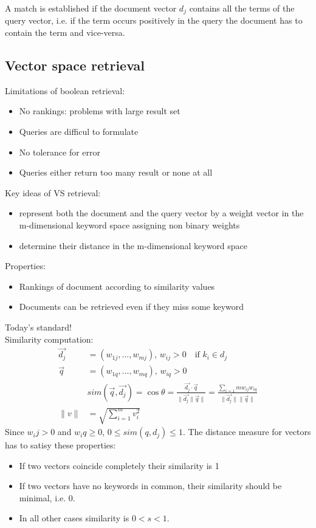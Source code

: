 A match is established if the document vector $ d_j $ contains
all the terms of the query vector, i.e. if the term occurs positively in
the query the document has to contain the term and vice-versa.

\subsection{Vector space retrieval}
Limitations of boolean retrieval:
\begin{itemize}
\item No rankings: problems with large result set
\item Queries are difficul to formulate
\item No tolerance for error
\item Queries either return too many result or none at all
\end{itemize}

Key ideas of VS retrieval:
\begin{itemize}
\item represent both the document and the query vector by a weight
  vector in the m-dimensional keyword space assigning non binary weights
\item determine their distance in the m-dimensional keyword space
\end{itemize}

Properties:
\begin{itemize}
\item Rankings of document according to similarity values
\item Documents can be retrieved even if they miss some keyword
\end{itemize}
Today's standard!
\\ Similarity computation:
\begin{align*}
  \vec{d_j} &= (w_{1j}, \ldots, w_{mj}), \, w_{ij} > 0 \quad \text{if } k_i \in d_j \\
  \vec{q} & = (w_{1q}, \ldots, w_{mq}), \, w_{iq} > 0 \\
            & sim(\vec{q}, \vec{d_j}) = \cos{\theta} = \frac{\vec{d_j} \cdot \vec{q}}{\| \vec{d_j} \| \vec{q} \|}
              = \frac{\sum_{i = 1}{m} w_{ij} w_{iq}}{\|\vec{d_j}\| \|\vec{q} \|} \\
  \| v \| &= \sqrt{\sum_{i = 1}^{m} v_i^2}
\end{align*}
Since $ w_ij > 0 $ and $ w_iq \geq 0 $, $ 0 \leq sim(q, d_j) \leq 1 $.
The distance measure for vectors has to satisy these properties:
\begin{itemize}
\item If two vectors coincide completely their similarity is 1
\item If two vectors have no keywords in common, their similarity
  should be minimal, i.e. 0.
\item In all other cases similarity is $ 0 < s < 1 $.
\end{itemize}

